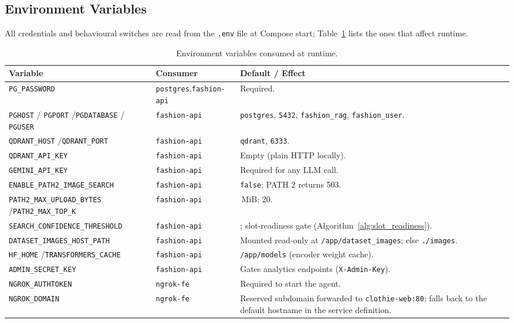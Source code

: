 \subsection{Environment Variables}

All credentials and behavioural switches are read from the \texttt{.env} file at Compose start; Table~\ref{tab:impl_env} lists the ones that affect runtime.

\begin{table}[H]
\centering
\caption{Environment variables consumed at runtime.}
\label{tab:impl_env}
\footnotesize
\setlength{\tabcolsep}{4pt}
\begin{tabular}{>{\raggedright\arraybackslash}p{4.6cm} >{\raggedright\arraybackslash}p{2.2cm} >{\raggedright\arraybackslash}p{7.2cm}}
\toprule
\textbf{Variable} & \textbf{Consumer} & \textbf{Default / Effect} \\
\midrule
\texttt{PG\_PASSWORD} & \texttt{postgres},\newline\texttt{fashion-api} & Required. \\
\texttt{PGHOST} / \texttt{PGPORT} /\newline\texttt{PGDATABASE} / \texttt{PGUSER} & \texttt{fashion-api} & \texttt{postgres}, \texttt{5432}, \texttt{fashion\_rag}, \texttt{fashion\_user}. \\
\texttt{QDRANT\_HOST} /\newline\texttt{QDRANT\_PORT} & \texttt{fashion-api} & \texttt{qdrant}, \texttt{6333}. \\
\texttt{QDRANT\_API\_KEY} & \texttt{fashion-api} & Empty (plain HTTP locally). \\
\texttt{GEMINI\_API\_KEY} & \texttt{fashion-api} & Required for any LLM call. \\
\texttt{ENABLE\_PATH2\_\allowbreak IMAGE\_SEARCH} & \texttt{fashion-api} & \texttt{false}; PATH 2 returns 503. \\
\texttt{PATH2\_MAX\_\allowbreak UPLOAD\_BYTES} /\newline\texttt{PATH2\_MAX\_TOP\_K} & \texttt{fashion-api} & 5\,MiB; 20. \\
\texttt{SEARCH\_CONFIDENCE\_\allowbreak THRESHOLD} & \texttt{fashion-api} & 0.75; slot-readiness gate (Algorithm~\ref{alg:slot_readiness}). \\
\texttt{DATASET\_IMAGES\_\allowbreak HOST\_PATH} & \texttt{fashion-api} & Mounted read-only at \texttt{/app/dataset\_images}; else \texttt{./images}. \\
\texttt{HF\_HOME} /\newline\texttt{TRANSFORMERS\_CACHE} & \texttt{fashion-api} & \texttt{/app/models} (encoder weight cache). \\
\texttt{ADMIN\_SECRET\_KEY} & \texttt{fashion-api} & Gates analytics endpoints (\texttt{X-Admin-Key}). \\
\texttt{NGROK\_AUTHTOKEN} & \texttt{ngrok-fe} & Required to start the agent. \\
\texttt{NGROK\_DOMAIN} & \texttt{ngrok-fe} & Reserved subdomain forwarded to \texttt{clothie-web:80}; falls back to the default hostname in the service definition. \\
\bottomrule
\end{tabular}
\end{table}

